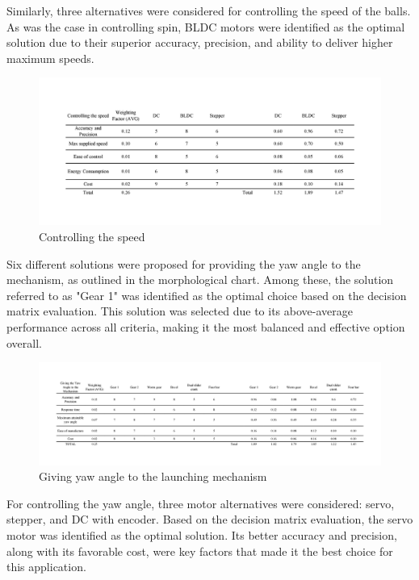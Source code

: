\documentclass[12pt]{article}
\begin{document}
Similarly, three alternatives were considered for controlling the speed of the balls. As was the case in controlling spin, BLDC motors were identified as the optimal solution due to their superior accuracy, precision, and ability to deliver higher maximum speeds.
\begin{figure}[H]
    \centering
    \includegraphics[width=1\textwidth]{Decision matrices/controlling speed.png}
    \caption{Controlling the speed}
\end{figure}

Six different solutions were proposed for providing the yaw angle to the mechanism, as outlined in the morphological chart. Among these, the solution referred to as "Gear 1" was identified as the optimal choice based on the decision matrix evaluation. This solution was selected due to its above-average performance across all criteria, making it the most balanced and effective option overall.

\begin{figure}[H]
    \centering
    \includegraphics[width=1\textwidth]{Decision matrices/yaw.png}
    \caption{Giving yaw angle to the launching mechanism}
\end{figure}

For controlling the yaw angle, three motor alternatives were considered: servo, stepper, and DC with encoder. Based on the decision matrix evaluation, the servo motor was identified as the optimal solution. Its better accuracy and precision, along with its favorable cost, were key factors that made it the best choice for this application.
\end{document}
